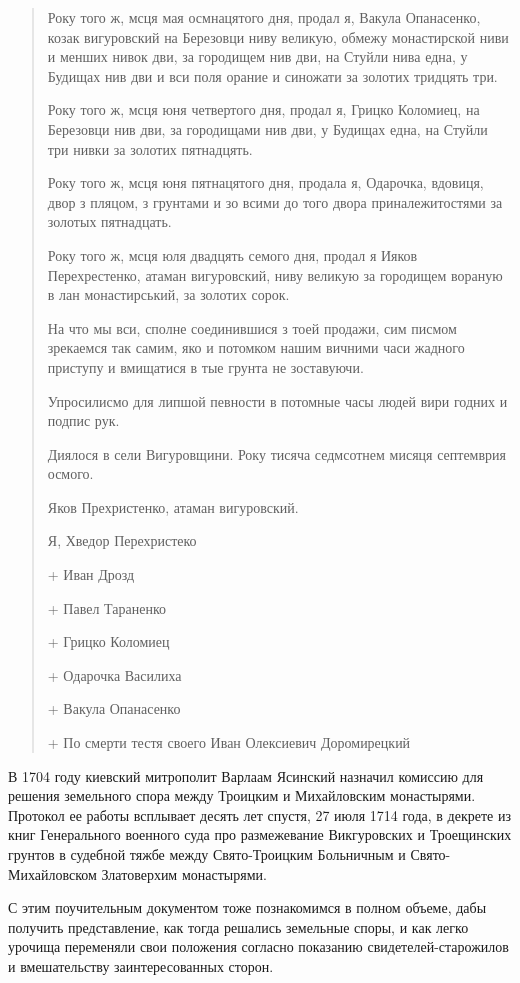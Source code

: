 \begin{quotation}
Року того ж, мсця мая осмнацятого дня, продал я, Вакула Опанасенко, козак вигуровский на Березовци ниву великую, обмежу монастирской ниви и менших нивок дви, за городищем нив дви, на Стуйли нива една, у Будищах нив дви и вси поля орание и синожати за золотих тридцять три. 

Року того ж, мсця юня четвертого дня, продал я, Грицко Коломиец, на Березовци нив дви, за городищами нив дви, у Будищах една, на Стуйли три нивки за золотих пятнадцять.

Року того ж, мсця юня пятнацятого дня, продала я, Одарочка, вдовиця, двор з пляцом, з грунтами и зо всими до того двора приналежитостями за золотых пятнадцать.

Року того ж, мсця юля двадцять семого дня, продал я Ияков Перехрестенко, атаман вигуровский, ниву великую за городищем вораную в лан монастирський, за золотих сорок.

На что мы вси, сполне соединившися з тоей продажи, сим писмом зрекаемся так самим, яко и потомком нашим вичними часи жадного приступу
и вмищатися в тые грунта не зоставуючи.

Упросилисмо для липшой певности в потомные часы людей вири годних и подпис рук.

Диялося в сели Вигуровщини. Року тисяча седмсотнем мисяця септемврия осмого.

Яков Прехристенко, атаман вигуровский.

Я, Хведор Перехристеко

+ Иван Дрозд

+ Павел Тараненко

+ Грицко Коломиец

+ Одарочка Василиха

+ Вакула Опанасенко

+ По смерти тестя своего Иван Олексиевич Доромирецкий
\end{quotation}

В 1704 году киевский митрополит Варлаам Ясинский назначил комиссию для решения земельного спора между Троицким и Михайловским монастырями. Протокол ее работы всплывает десять лет спустя, 27 июля 1714 года, в декрете из книг Генерального военного суда про размежевание Викгуровских и Троещинских грунтов в судебной тяжбе между Свято-Троицким Больничным и Свято-Михайловском Златоверхим монастырями.

С этим поучительным документом тоже познакомимся в полном объеме, дабы получить представление, как тогда решались земельные споры, и как легко урочища переменяли свои положения согласно показанию свидетелей-старожилов и вмешательству заинтересованных сторон.


